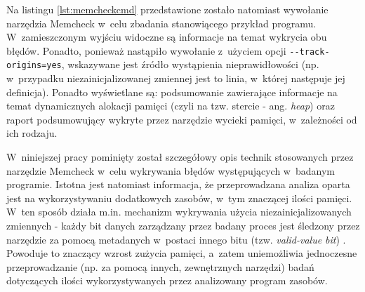 Na listingu \ref{lst:memcheckcmd} przedstawione zostało natomiast wywołanie narzędzia Memcheck w~celu zbadania stanowiącego przykład programu. W~zamieszczonym wyjściu widoczne są informacje na temat wykrycia obu błędów. Ponadto, ponieważ nastąpiło wywołanie z~użyciem opcji \lstinline{--track-origins=yes}, wskazywane jest źródło wystąpienia nieprawidłowości (np. w~przypadku niezainicjalizowanej zmiennej jest to linia, w~której następuje jej definicja). Ponadto wyświetlane są: podsumowanie zawierające informacje na temat dynamicznych alokacji pamięci (czyli na tzw. stercie - ang. \emph{heap}) oraz raport podsumowujący wykryte przez narzędzie wycieki pamięci, w~zależności od ich rodzaju.



W~niniejszej pracy pominięty został szczegółowy opis technik stosowanych przez narzędzie Memcheck w~celu wykrywania błędów występujących w~badanym programie. Istotna jest natomiast informacja, że przeprowadzana analiza oparta jest na wykorzystywaniu dodatkowych zasobów, w~tym znaczącej ilości pamięci. W~ten sposób działa m.in. mechanizm wykrywania użycia niezainicjalizowanych zmiennych - każdy bit danych zarządzany przez badany proces jest śledzony przez narzędzie za pomocą metadanych w~postaci innego bitu (tzw. \emph{valid-value bit}) \cite{memcheck_1}. Powoduje to znaczący wzrost zużycia pamięci, a~zatem uniemożliwia jednoczesne przeprowadzanie (np. za pomocą innych, zewnętrznych narzędzi) badań dotyczących ilości wykorzystywanych przez analizowany program zasobów.

